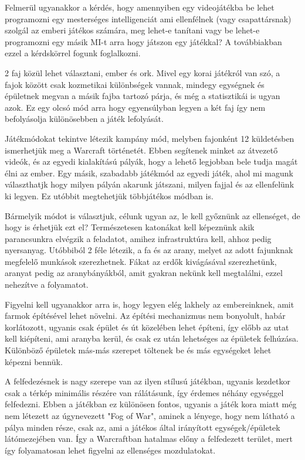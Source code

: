 Felmerül ugyanakkor a kérdés, hogy amennyiben egy videojátékba be lehet programozni egy mesterséges intelligenciát ami ellenfélnek (vagy csapattársnak) szolgál az emberi játékos számára, meg lehet-e tanítani vagy be lehet-e programozni egy másik MI-t arra hogy játszon egy játékkal? A továbbiakban ezzel a kérdskörrel fogunk foglalkozni.


2 faj közül lehet választani, ember és ork. Mivel egy korai játékról van szó, a fajok között csak kozmetikai különbségek vannak, mindegy egységnek és épületnek megvan a másik fajba tartozó párja, és még a statisztikái is ugyan azok. Ez egy olcsó mód arra hogy egyensúlyban legyen a két faj így nem befolyásolja különösebben a játék lefolyását.

Játékmódokat tekintve létezik kampány mód, melyben fajonként 12 küldetésben ismerhetjük meg a Warcraft történetét. Ebben segítenek minket az átvezető videók, és az egyedi kialakítású pályák, hogy a lehető legjobban bele tudja magát élni az ember.
Egy másik, szabadabb játékmód az egyedi játék, ahol mi magunk választhatjk hogy milyen pályán akarunk játszani, milyen fajjal és az ellenfelünk ki legyen. Ez utóbbit megtehetjük többjátékos módban is.

Bármelyik módot is választjuk, célunk ugyan az, le kell győznünk az ellenséget, de hogy is érhetjük ezt el? Természetesen katonákat kell képeznünk akik parancsunkra elvégzik a feladatot, amihez infrastruktúra kell, ahhoz pedig nyersanyag. Utóbbiból 2 féle létezik, a fa és az arany, melyet az adott fajunknak megfelelő munkások szerezhetnek. Fákat az erdők kivágásával szerezhetünk, aranyat pedig az aranybányákból, amit gyakran nekünk kell megtalálni, ezzel nehezítve a folyamatot. 

Figyelni kell ugyanakkor arra is, hogy legyen elég lakhely az embereinknek, amit farmok építésével lehet növelni. Az építési mechanizmus nem bonyolult, habár korlátozott, ugyanis csak épület és út közelében lehet építeni, így előbb az utat kell kiépíteni, ami aranyba kerül, és csak ez után lehetséges az épületek felhúzása. Különböző épületek más-más szerepet töltenek be és más egységeket lehet képezni bennük. 

A felfedezésnek is nagy szerepe van az ilyen stílusú játékban, ugyanis kezdetkor csak a térkép minimális részére van rálátásunk, így érdemes néhány egységgel felfedezni. Ebben a játékban ez különösen fontos, ugyanis a játék kora miatt még nem létezett az úgynevezett "Fog of War", aminek a lényege, hogy nem látható a pálya minden része, csak az, ami a játékos által irányított egységek/épületek látómezejében van. Így a Warcraftban hatalmas előny a felfedezett terület, mert így folyamatosan lehet figyelni az ellenséges mozdulatokat.

